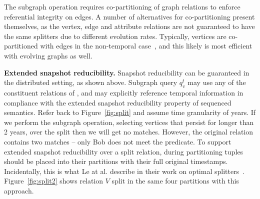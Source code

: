 The subgraph operation requires co-partitioning of graph relations to
enforce referential integrity on edges.  A number of alternatives for
co-partitioning present themselves, as the
vertex, edge and attribute relations are not guaranteed to have the
same splitters due to different evolution rates.  Typically, vertices
are co-partitioned with edges in the non-temporal
case~\cite{DBLP:conf/osdi/GonzalezXDCFS14}, and this likely is most
efficient with evolving graphs as well.




{\bf Extended snapshot reducibility.}  Snapshot reducibility can be
guaranteed in the distributed setting, as shown above.  Subgraph query $q^t_v$ may use any of the constituent
relations of \tve, and may explicitly reference temporal information
in compliance with the extended snapshot reducibility property of
sequenced semantics.  Refer back to Figure~\ref{fig:split} and assume
time granularity of years.  If we perform the subgraph operation,
selecting vertices that persist for longer than 2 years, over the
split then we will get no matches.  However, the original relation
contains two matches -- only Bob does not
meet the predicate.  To support extended snapshot reducibility over a
split relation, during partitioning tuples should be placed into their
partitions with their full original timestamps.  Incidentally, this is
what Le at al. describe in their work on optimal
splitters~\cite{Le2013}.  Figure~\ref{fig:split2} shows relation $V$
split in the same four partitions with this approach.

